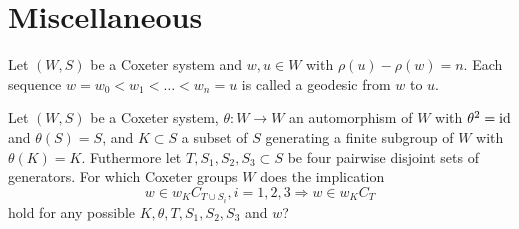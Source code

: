 \section{Miscellaneous}

\begin{defi}[Geodesic]
	Let $(W,S)$ be a Coxeter system and $w,u \in W$ with $\rho(u) - \rho(w) = n$. Each sequence $w = w_0 < w_1 < \ldots < w_n = u$ is called a geodesic from $w$ to $u$.
\end{defi}

\begin{ques}
	Let $(W,S)$ be a Coxeter system, $\theta : W \to W$ an automorphism of $W$ with $\theta^2 = \operatorname{id}$ and $\theta(S) = S$, and $K \subset S$ a subset of $S$ generating a finite subgroup of $W$ with $\theta(K) = K$. Futhermore let $T,S_1,S_2,S_3 \subset S$ be four pairwise disjoint sets of generators. For which Coxeter groups $W$ does the implication
	\begin{equation}
		\label{eq:main}
		w \in w_K C_{T \cup S_i}, i=1,2,3 \Rightarrow w \in w_K C_T
	\end{equation}
	hold for any possible $K,\theta,T,S_1,S_2,S_3$ and $w$?
\end{ques}

